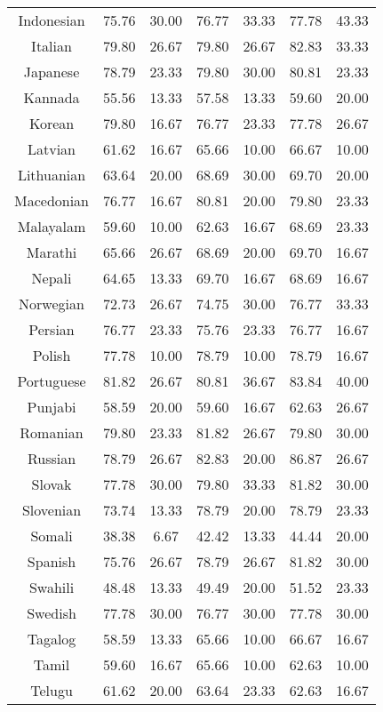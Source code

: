 \begin{table*}[]
\begin{tabular}{c|cc|cc|cc}
Indonesian & 75.76 & 30.00 & 76.77 & 33.33 & 77.78 & 43.33 \\
Italian & 79.80 & 26.67 & 79.80 & 26.67 & 82.83 & 33.33 \\
Japanese & 78.79 & 23.33 & 79.80 & 30.00 & 80.81 & 23.33 \\
Kannada & 55.56 & 13.33 & 57.58 & 13.33 & 59.60 & 20.00 \\
Korean & 79.80 & 16.67 & 76.77 & 23.33 & 77.78 & 26.67 \\
Latvian & 61.62 & 16.67 & 65.66 & 10.00 & 66.67 & 10.00 \\
Lithuanian & 63.64 & 20.00 & 68.69 & 30.00 & 69.70 & 20.00 \\
Macedonian & 76.77 & 16.67 & 80.81 & 20.00 & 79.80 & 23.33 \\
Malayalam & 59.60 & 10.00 & 62.63 & 16.67 & 68.69 & 23.33 \\
Marathi & 65.66 & 26.67 & 68.69 & 20.00 & 69.70 & 16.67 \\
Nepali & 64.65 & 13.33 & 69.70 & 16.67 & 68.69 & 16.67 \\
Norwegian & 72.73 & 26.67 & 74.75 & 30.00 & 76.77 & 33.33 \\
Persian & 76.77 & 23.33 & 75.76 & 23.33 & 76.77 & 16.67 \\
Polish & 77.78 & 10.00 & 78.79 & 10.00 & 78.79 & 16.67 \\
Portuguese & 81.82 & 26.67 & 80.81 & 36.67 & 83.84 & 40.00 \\
Punjabi & 58.59 & 20.00 & 59.60 & 16.67 & 62.63 & 26.67 \\
Romanian & 79.80 & 23.33 & 81.82 & 26.67 & 79.80 & 30.00 \\
Russian & 78.79 & 26.67 & 82.83 & 20.00 & 86.87 & 26.67 \\
Slovak & 77.78 & 30.00 & 79.80 & 33.33 & 81.82 & 30.00 \\
Slovenian & 73.74 & 13.33 & 78.79 & 20.00 & 78.79 & 23.33 \\
Somali & 38.38 & 6.67 & 42.42 & 13.33 & 44.44 & 20.00 \\
Spanish & 75.76 & 26.67 & 78.79 & 26.67 & 81.82 & 30.00 \\
Swahili & 48.48 & 13.33 & 49.49 & 20.00 & 51.52 & 23.33 \\
Swedish & 77.78 & 30.00 & 76.77 & 30.00 & 77.78 & 30.00 \\
Tagalog & 58.59 & 13.33 & 65.66 & 10.00 & 66.67 & 16.67 \\
Tamil & 59.60 & 16.67 & 65.66 & 10.00 & 62.63 & 10.00 \\
Telugu & 61.62 & 20.00 & 63.64 & 23.33 & 62.63 & 16.67 \\

\end{tabular}
\end{table*}
